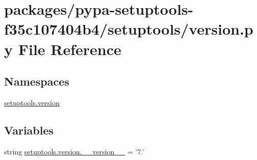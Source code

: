 \hypertarget{pypa-setuptools-f35c107404b4_2setuptools_2version_8py}{}\section{packages/pypa-\/setuptools-\/f35c107404b4/setuptools/version.py File Reference}
\label{pypa-setuptools-f35c107404b4_2setuptools_2version_8py}
\subsection*{Namespaces}
\begin{DoxyCompactItemize}
\item 
 \hyperlink{namespacesetuptools_1_1version}{setuptools.\+version}
\end{DoxyCompactItemize}
\subsection*{Variables}
\begin{DoxyCompactItemize}
\item 
string \hyperlink{namespacesetuptools_1_1version_ab4d4833f5d1e743e5f839abe82af05ec}{setuptools.\+version.\+\_\+\+\_\+version\+\_\+\+\_\+} = '7.'
\end{DoxyCompactItemize}
